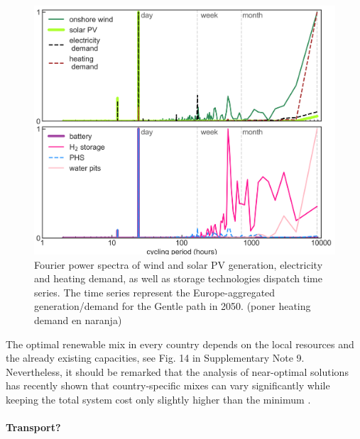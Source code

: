 \documentclass[5p]{elsarticle} %
\begin{document}
\begin{figure}[!h]
\centering
\includegraphics[width=\columnwidth]{figures/Fourier.png}
\caption{Fourier power spectra of wind and solar PV generation, electricity and heating demand, as well as storage technologies dispatch time series. The time series represent the Europe-aggregated generation/demand for \textcolor[rgb]{1,0,0}{the Gentle path in 2050. (poner heating demand en naranja)}} \label{fig_Fourier} 
\end{figure}


The optimal renewable mix in every country depends on the local resources and the already existing capacities, see Fig. 14 in Supplementary Note 9. Nevertheless, it should be remarked that the analysis of near-optimal solutions has recently shown that country-specific mixes can vary significantly while keeping the total system cost only slightly higher than the minimum \cite{Neumann_2019}. 

\FloatBarrier
 
\paragraph{\textbf{ Transport?}} \
\end{document}
